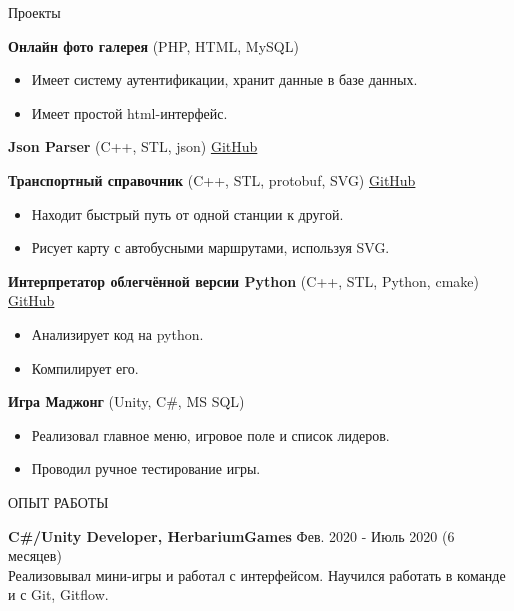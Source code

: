 \documentclass{resume} %
\begin{document}
\begin{rSection}{Проекты}
\vspace{-1.25em}
\item \textbf{Онлайн фото галерея} {(PHP, HTML, MySQL)} \hfill
\begin{itemize}
    \itemsep -3pt {} 
     \item Имеет систему аутентификации, хранит данные в базе данных.
     \item Имеет простой html-интерфейс.
 \end{itemize}
 
\item \textbf{Json Parser} {(C++, STL, json)} \hfill
\href{https://github.com/Bfalse123/jsonparser}{GitHub}
 
\item \textbf{Транспортный справочник} {(C++, STL, protobuf, SVG)} \hfill \href{https://github.com/Bfalse123/TransportDirectory}{GitHub}
\begin{itemize}
    \itemsep -3pt {} 
     \item Находит быстрый путь от одной станции к другой.
     \item Рисует карту с автобусными маршрутами, используя SVG.
 \end{itemize}

 \item \textbf{Интерпретатор облегчённой версии Python} {(C++, STL, Python, cmake)} \hfill \href{https://github.com/Bfalse123/LitePythonInterpreter/}{GitHub}
 \begin{itemize}
     \itemsep -3pt {} 
      \item Анализирует код на python.
      \item Компилирует его.
  \end{itemize}
 
 \item \textbf{Игра Маджонг} {(Unity, C\#, MS SQL)} \hfill
\begin{itemize}
    \itemsep -3pt {} 
     \item Реализовал главное меню, игровое поле и список лидеров.
     \item Проводил ручное тестирование игры.
 \end{itemize}
\end{rSection} 
 
 
\begin{rSection}{ОПЫТ РАБОТЫ}
 
\textbf{C\#/Unity Developer, HerbariumGames} \hfill Фев. 2020 - Июль 2020 (6 месяцев)\\
Реализовывал мини-игры и работал с интерфейсом. Научился работать в команде и с Git, Gitflow.
 
\end{rSection} 
 
\end{document}
